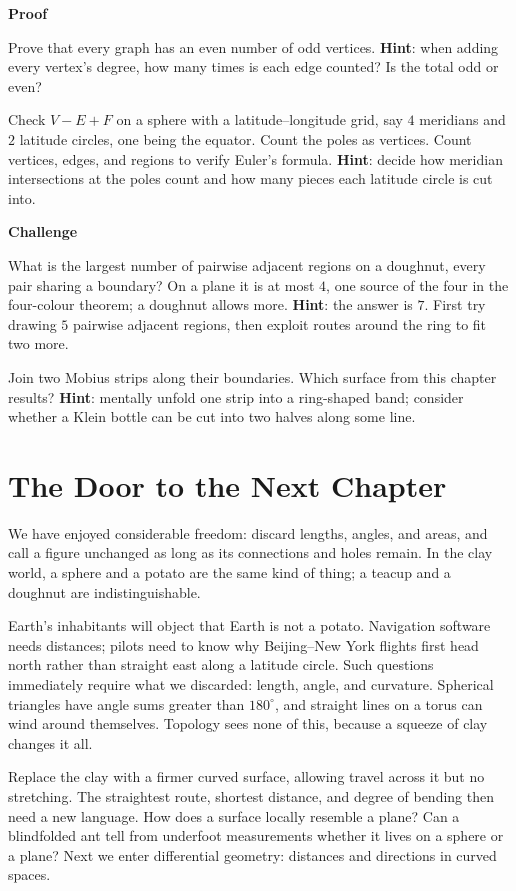\textbf{Proof}

\begin{sikao}
  \item Prove that every graph has an even number of odd vertices. \textbf{Hint}: when adding every vertex's degree, how many times is each edge counted? Is the total odd or even?
  \item Check $V-E+F$ on a sphere with a latitude--longitude grid, say $4$ meridians and $2$ latitude circles, one being the equator. Count the poles as vertices. Count vertices, edges, and regions to verify Euler's formula. \textbf{Hint}: decide how meridian intersections at the poles count and how many pieces each latitude circle is cut into.
\end{sikao}

\textbf{Challenge}

\begin{sikao}
  \item What is the largest number of pairwise adjacent regions on a doughnut, every pair sharing a boundary? On a plane it is at most $4$, one source of the four in the four-colour theorem; a doughnut allows more. \textbf{Hint}: the answer is $7$. First try drawing $5$ pairwise adjacent regions, then exploit routes around the ring to fit two more.
  \item Join two Mobius strips along their boundaries. Which surface from this chapter results? \textbf{Hint}: mentally unfold one strip into a ring-shaped band; consider whether a Klein bottle can be cut into two halves along some line.
\end{sikao}

\section*{The Door to the Next Chapter}

We have enjoyed considerable freedom: discard lengths, angles, and areas, and call a figure unchanged as long as its connections and holes remain. In the clay world, a sphere and a potato are the same kind of thing; a teacup and a doughnut are indistinguishable.

Earth's inhabitants will object that Earth is not a potato. Navigation software needs distances; pilots need to know why Beijing--New York flights first head north rather than straight east along a latitude circle. Such questions immediately require what we discarded: length, angle, and curvature. Spherical triangles have angle sums greater than $180^{\circ}$, and straight lines on a torus can wind around themselves. Topology sees none of this, because a squeeze of clay changes it all.

Replace the clay with a firmer curved surface, allowing travel across it but no stretching. The straightest route, shortest distance, and degree of bending then need a new language. How does a surface locally resemble a plane? Can a blindfolded ant tell from underfoot measurements whether it lives on a sphere or a plane? Next we enter differential geometry: distances and directions in curved spaces.

